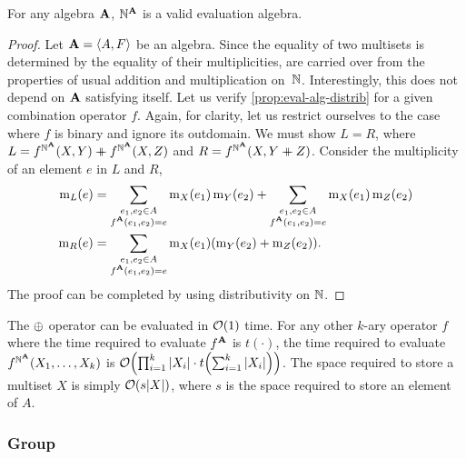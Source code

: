 \begin{lemma}[Validity]
    For any algebra \(\mathbf{A}\), \(\mathbb{N}^{\mathbf{A}}\) is a valid evaluation algebra.
\end{lemma}
\begin{proof}
    Let \(\mathbf{A} = \left\langle A, F\right\rangle\) be an algebra.
    Since the equality of two multisets is determined by the equality of their multiplicities,  are carried over from the properties of usual addition and multiplication on~\(\mathbb{N}\).
    Interestingly, this does not depend on \(\mathbf{A}\) satisfying  itself.
    Let us verify \cref{prop:eval-alg-distrib} for a given combination operator \(f\).
    Again, for clarity, let us restrict ourselves to the case where \(f\) is binary and ignore its outdomain.
    We must show \(L = R\), where
    \(L = f^{\mathbb{N}^{\mathbf{A}}}(X, Y) \mathbin{+\mkern-11.5mu+} f^{\mathbb{N}^{\mathbf{A}}}(X, Z)\)
    and \(R = f^{\mathbb{N}^{\mathbf{A}}}(X, Y \mathbin{+\mkern-11.5mu+} Z)\).
    Consider the multiplicity of an element \(e\) in \(L\) and \(R\),
    \begin{align*}
        \operatorname{m}_L(e) &=
            \sum_{\substack{e_1,e_2 \in A\\f^{\mathbf{A}}(e_1,e_2)=e}}{
                \operatorname{m}_X(e_1)\operatorname{m}_Y(e_2)} +
            \sum_{\substack{e_1,e_2 \in A\\f^{\mathbf{A}}(e_1,e_2)=e}}{
                \operatorname{m}_X(e_1)\operatorname{m}_Z(e_2)} \\
        \operatorname{m}_R(e) &=
            \sum_{\substack{e_1,e_2 \in A\\f^{\mathbf{A}}(e_1,e_2)=e}}{
                \operatorname{m}_X(e_1)
                (\operatorname{m}_Y(e_2) + \operatorname{m}_Z(e_2))
            }.
    \end{align*}
    The proof can be completed by using distributivity on \(\mathbb{N}\).
\end{proof}

\begin{lemma}[Complexity]
    The \(\mathbin{\oplus}\) operator can be evaluated in \(\operatorname{\mathcal{O}}(1)\) time.
    For any other \(k\)-ary operator \(f\) where the time required to evaluate \(f^{\mathbf{A}}\) is \(t(\cdot)\), the time required to evaluate \(f^{\mathbb{N}^{\mathbf{A}}}(X_1, \ldots, X_k)\)
    is \(\operatorname{\mathcal{O}}\!\left(
        \prod_{i=1}^k|X_i| \cdot
        t\!\left(\sum_{i=1}^k|X_i|\right)
    \right)\).
    The space required to store a multiset \(X\) is simply \(\operatorname{\mathcal{O}}(s|X|)\), where \(s\) is the space required to store an element of \(A\).
\end{lemma}

\subsubsection{Group}

